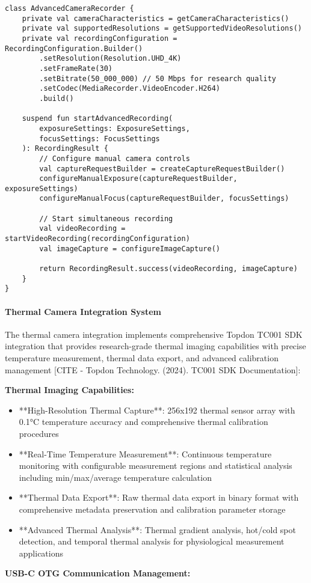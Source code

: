 \documentclass[12pt,a4paper]{article}
\begin{document}
\begin{verbatim}
class AdvancedCameraRecorder {
    private val cameraCharacteristics = getCameraCharacteristics()
    private val supportedResolutions = getSupportedVideoResolutions()
    private val recordingConfiguration = RecordingConfiguration.Builder()
        .setResolution(Resolution.UHD_4K)
        .setFrameRate(30)
        .setBitrate(50_000_000) // 50 Mbps for research quality
        .setCodec(MediaRecorder.VideoEncoder.H264)
        .build()

    suspend fun startAdvancedRecording(
        exposureSettings: ExposureSettings,
        focusSettings: FocusSettings
    ): RecordingResult {
        // Configure manual camera controls
        val captureRequestBuilder = createCaptureRequestBuilder()
        configureManualExposure(captureRequestBuilder, exposureSettings)
        configureManualFocus(captureRequestBuilder, focusSettings)

        // Start simultaneous recording
        val videoRecording = startVideoRecording(recordingConfiguration)
        val imageCapture = configureImageCapture()

        return RecordingResult.success(videoRecording, imageCapture)
    }
}
\end{verbatim}

\paragraph{Thermal Camera Integration System}

The thermal camera integration implements comprehensive Topdon TC001 SDK integration that provides research-grade
thermal imaging capabilities with precise temperature measurement, thermal data export, and advanced calibration
management [CITE - Topdon Technology. (2024). TC001 SDK Documentation]:

\textbf{Thermal Imaging Capabilities:}

\begin{itemize}
\item **High-Resolution Thermal Capture**: 256x192 thermal sensor array with 0.1°C temperature accuracy and comprehensive
  thermal calibration procedures
\item **Real-Time Temperature Measurement**: Continuous temperature monitoring with configurable measurement regions and
  statistical analysis including min/max/average temperature calculation
\item **Thermal Data Export**: Raw thermal data export in binary format with comprehensive metadata preservation and
  calibration parameter storage
\item **Advanced Thermal Analysis**: Thermal gradient analysis, hot/cold spot detection, and temporal thermal analysis for
  physiological measurement applications

\end{itemize}
\textbf{USB-C OTG Communication Management:}
\end{document}
